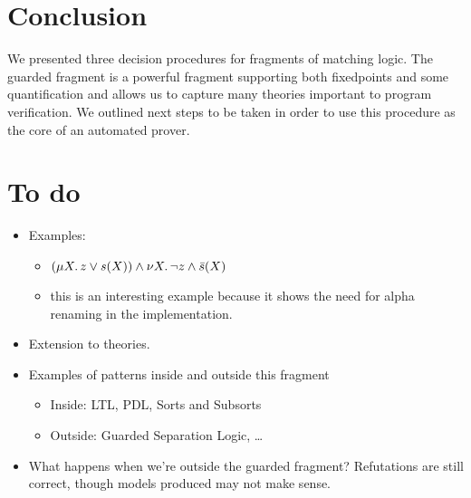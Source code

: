 \hypertarget{conclusion}{%
\section{Conclusion}\label{conclusion}}

We presented three decision procedures for fragments of matching logic.
The guarded fragment is a powerful fragment supporting both fixedpoints
and some quantification and allows us to capture many theories important to program verification.
We outlined next steps to be taken in order to use this procedure as the core of an automated prover.
\clearpage

\hypertarget{to-do}{%
\section{To do}\label{to-do}}

\begin{itemize}
\tightlist
\item
  Examples:

  \begin{itemize}
  \tightlist
  \item
    \((\mu X \ldotp z \lor s(X)) \land \nu X \ldotp \lnot z \land \bar s(X)\)
  \item
    this is an interesting example because it shows the need for alpha renaming in the implementation.
  \end{itemize}
\item
  Extension to theories.
\item
  Examples of patterns inside and outside this fragment

  \begin{itemize}
  \tightlist
  \item
    Inside: LTL, PDL, Sorts and Subsorts
  \item
    Outside: Guarded Separation Logic, \ldots{}
  \end{itemize}
\item
  What happens when we're outside the guarded fragment?
  Refutations are still correct, though models produced may not make sense.
\end{itemize}
